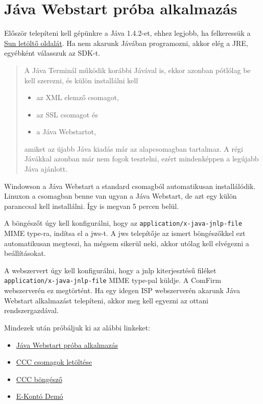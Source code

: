 
\section*{Jáva Webstart próba alkalmazás}

Először telepíteni kell gépünkre a Jáva 1.4.2-et,
ehhez legjobb, ha felkeressük a
\href{http://java.sun.com/j2se/1.4.2/download.html}{Sun letöltő oldalát}.
Ha nem akarunk Jávában programozni, akkor elég a JRE, 
egyébként válasszuk az SDK-t.

\begin{quote}\small
A Jáva Terminál működik korábbi Jávával is,
ekkor azonban pótlólag be kell szerezni, és külön installálni kell
\begin{itemize}
  \item az XML elemző csomagot,
  \item az SSL csomagot és
  \item a Jáva Webstartot,
\end{itemize}
amiket az újabb Jáva kiadás már az alapcsomagban tartalmaz.
A régi Jávákkal azonban már nem fogok tesztelni, 
ezért mindenképpen a legújabb  Jáva ajánlott. 
\end{quote}

Windowson  a Jáva Webstart a standard csomagból automatikusan 
installálódik. Linuxon a csomagban benne van ugyan a Jáva Webstart, 
de azt egy külön paranccsal kell installálni. 
Így is megvan 5 percen belül.

A böngészőt úgy kell konfigurálni, 
hogy az \verb!application/x-java-jnlp-file! MIME type-ra, 
indítsa el a jws-t. A jws telepítője az ismert böngészőkkel
ezt automatikusan megteszi, ha mégsem sikerül neki, 
akkor utólag kell elvégezni a beállításokat.

A webszervert  úgy kell konfigurálni, hogy a jnlp kiterjesztésű 
filéket \verb!application/x-java-jnlp-file! MIME type-pal küldje.
A ComFirm webszerverén ez megtörtént. Ha egy idegen ISP 
webszerverén akarunk Jáva Webstart alkalmazást telepíteni, 
akkor meg kell egyezni az ottani rendszergazdával.



Mindezek után próbáljuk ki az alábbi linkeket:
\begin{itemize}
\item
  \href{http://ok.comfirm.hu/jnlp/jtproba.jnlp}{Jáva Webstart próba alkalmazás}\par
\item
  \href{http://ok.comfirm.hu/jnlp/cccdown.jnlp}{CCC csomagok letöltése}\par 
\item
  \href{http://ok.comfirm.hu/jnlp/browse.jnlp}{CCC böngésző}\par 
\item
  \href{http://ok.comfirm.hu/jnlp/ekonto.jnlp}{E-Kontó Demó}\par 
\end{itemize}

